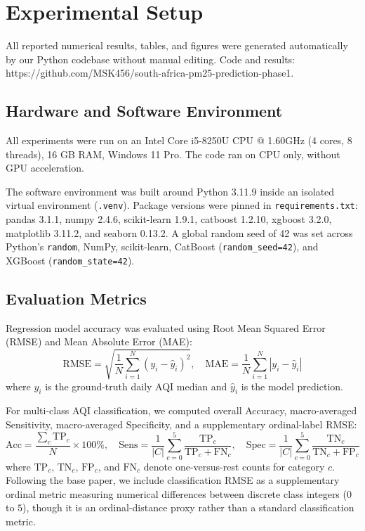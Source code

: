 \section{Experimental Setup}
All reported numerical results, tables, and figures were generated automatically by our Python codebase without manual editing. Code and results: https://github.com/MSK456/south-africa-pm25-prediction-phase1.

\subsection{Hardware and Software Environment}
All experiments were run on an Intel Core i5-8250U CPU @ 1.60GHz (4 cores, 8 threads), 16 GB RAM, Windows 11 Pro. The code ran on CPU only, without GPU acceleration.

The software environment was built around Python 3.11.9 inside an isolated virtual environment (\texttt{.venv}). Package versions were pinned in \texttt{requirements.txt}: pandas 3.1.1, numpy 2.4.6, scikit-learn 1.9.1, catboost 1.2.10, xgboost 3.2.0, matplotlib 3.11.2, and seaborn 0.13.2. A global random seed of 42 was set across Python's \texttt{random}, NumPy, scikit-learn, CatBoost (\texttt{random\_seed=42}), and XGBoost (\texttt{random\_state=42}).

\subsection{Evaluation Metrics}
Regression model accuracy was evaluated using Root Mean Squared Error (RMSE) and Mean Absolute Error (MAE):
\begin{equation}
\text{RMSE} = \sqrt{\frac{1}{N}\sum_{i=1}^{N}(y_i - \hat{y}_i)^2}, \quad \text{MAE} = \frac{1}{N}\sum_{i=1}^{N}|y_i - \hat{y}_i|
\end{equation}
where $y_i$ is the ground-truth daily AQI median and $\hat{y}_i$ is the model prediction.

For multi-class AQI classification, we computed overall Accuracy, macro-averaged Sensitivity, macro-averaged Specificity, and a supplementary ordinal-label RMSE:
\begin{equation}
\text{Acc} = \frac{\sum_{c}\text{TP}_c}{N} \times 100\%, \quad \text{Sens} = \frac{1}{|C|}\sum_{c=0}^{5}\frac{\text{TP}_c}{\text{TP}_c + \text{FN}_c}, \quad \text{Spec} = \frac{1}{|C|}\sum_{c=0}^{5}\frac{\text{TN}_c}{\text{TN}_c + \text{FP}_c}
\end{equation}
where $\text{TP}_c$, $\text{TN}_c$, $\text{FP}_c$, and $\text{FN}_c$ denote one-versus-rest counts for category $c$. Following the base paper, we include classification RMSE as a supplementary ordinal metric measuring numerical differences between discrete class integers ($0$ to $5$), though it is an ordinal-distance proxy rather than a standard classification metric.
